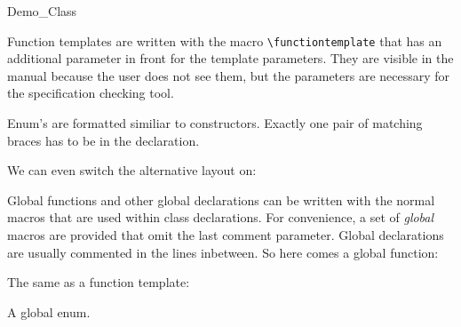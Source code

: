 \documentclass[12pt]{article}
\begin{document}
\begin{class}{Demo_Class}
\def\CCalternateThreeColumn{\CCfalse}

Function templates are written with the macro \verb+\functiontemplate+
that has an additional parameter in front for the template
parameters. They are visible in the manual because the user does not
see them, but the parameters are necessary for the specification
checking tool.

\threecolumns{2.8cm}{8.7cm}


Enum's are formatted similiar to constructors. Exactly one pair of
matching braces has to be in the declaration.



We can even switch the alternative layout on:

\gdef\CCalternateThreeColumn{\CCtrue}


\threecolumns{3.5cm}{3.5cm}







\end{class}

Global functions and other global declarations can be written with the 
normal macros that are used within class declarations. For convenience, 
a set of {\em global\/} macros are provided that omit the last comment
parameter. Global declarations are usually commented in the lines
inbetween. So here comes a global function:

The same 
as a function template:

A global enum.
\end{document}
